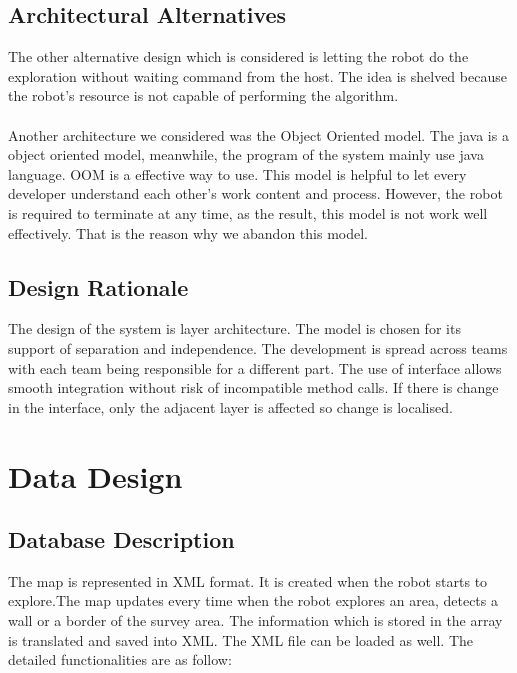 \documentclass[11pt, a4paper]{report}
\begin{document}
\section{Architectural Alternatives}
The other alternative design which is considered is letting the robot do the exploration without
waiting command from the host. The idea is shelved because the robot's resource is not capable
of performing the  algorithm.\\ \\
Another architecture we considered was the Object Oriented model. The java is a object oriented model, meanwhile, the program of the system mainly use java language. OOM is a effective way to use. This model is helpful to let every developer understand each other's work content and process. However, the robot is required to terminate at any time, as the result, this model is not work well effectively. That is the reason why we abandon this model.



\section{Design Rationale}
The design of the system is layer architecture. The model is chosen for its support of separation
and independence. The development is spread across teams with each team being responsible
for a different part. The use of interface allows smooth integration without risk of
 incompatible method calls. If there is change in the interface, only the adjacent layer is affected
 so change is localised.

\pagebreak


\chapter{Data Design}%
\label{cha:DD1}

\section{Database Description}
The map is represented in XML format. It is created when the robot starts to explore.The map updates every time when the robot explores an area, detects
a wall or a border of the survey area. The information which is stored in the array is translated
and saved into XML. The XML file can be loaded as well. The detailed functionalities are
as follow:
\end{document}
